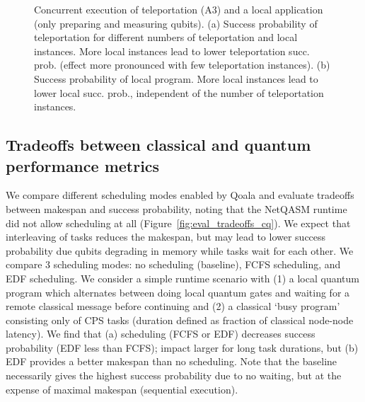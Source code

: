 \begin{figure*}
    \newcommand{\heatmapheight}{6.6cm}
    \centering
    \hfill
    \caption{
        Concurrent execution of teleportation (A3) and a local application (only preparing and measuring qubits).
        (a) Success probability of teleportation for different numbers of teleportation and local instances.
        More local instances lead to lower teleportation succ. prob. (effect more pronounced with few teleportation instances).
        (b) Success probability of local program. More local instances lead to lower local succ. prob., independent of the number of teleportation instances.}%
    \label{fig:quantum_multi_tasking}%
\end{figure*}


\subsection{Tradeoffs between classical and quantum performance metrics}
\label{sec:effectiveness_of_task_splitting}
We compare different scheduling modes enabled by Qoala and evaluate tradeoffs between makespan and success probability, noting that the NetQASM runtime did not allow scheduling at all (Figure~\ref{fig:eval_tradeoffs_cq}).
We expect that interleaving of tasks reduces the makespan, but may lead to lower success probability due qubits degrading in memory while tasks wait for each other.
We compare 3 scheduling modes: no scheduling (baseline), FCFS scheduling, and EDF scheduling.
We consider a simple runtime scenario with 
(1) a local quantum program which alternates between doing local quantum gates and waiting for a remote classical message before continuing and 
(2) a classical `busy program' consisting only of CPS tasks (duration defined as fraction of classical node-node latency).
We find that
(a) scheduling (FCFS or EDF) decreases success probability (EDF less than FCFS); impact larger for long task durations, but
(b) EDF provides a better makespan than no scheduling.
Note that the baseline necessarily gives the highest success probability due to no waiting, but at the expense of maximal makespan (sequential execution).

